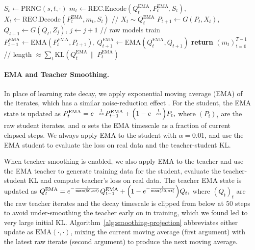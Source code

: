 \documentclass{article}
\theoremstyle{plain}
\theoremstyle{definition}
\theoremstyle{remark}
\begin{document}
\begin{algorithm}[t]
\begin{algorithmic}[1]
    \ENDWHILE
  \ENDIF
  \STATE $S_t \leftarrow \mathrm{PRNG}(s,t,\cdot)$
  \STATE $m_t \leftarrow \mathrm{REC.Encode}(Q^{\text{EMA}}_t, P^{\text{EMA}}_t, S_t)$, \quad $X_t \leftarrow \mathrm{REC.Decode}(P^{\text{EMA}}_t, m_t, S_t)$ \hfill {\color{black!55}// $X_t \sim Q^{\text{EMA}}_t$}
  \STATE $P_{t+1} \leftarrow G(P_t, X_t)$, \quad $Q_{t+1} \leftarrow G(Q_t, Z_j)$, \; $j \leftarrow j+1$ \hfill {\color{black!55}// raw models train}
  \STATE $P^{\text{EMA}}_{t+1} \leftarrow \mathrm{EMA}(P^{\text{EMA}}_t, P_{t+1})$, \quad $Q^{\text{EMA}}_{t+1} \leftarrow \mathrm{EMA}(Q^{\text{EMA}}_t, Q_{t+1})$
\ENDFOR
\STATE \textbf{return} $(m_t)_{t=0}^{T-1}$ \hfill {\color{black!55}//  length $\approx \sum_{t} \mathrm{KL}(Q^{\text{EMA}}_t\,\|\,P^{\text{EMA}}_t)$}
\end{algorithmic}
\end{algorithm}


\paragraph{EMA and Teacher Smoothing.}
In place of learning rate decay, we apply exponential moving average (EMA) of the iterates, which has a similar noise-reduction effect \citep{hagele2024scaling}. For the student, the EMA state is updated as $P^{\text{EMA}}_{t} = e^{-\frac{1}{\alpha t}} P^{\text{EMA}}_{t-1} + \qty(1 - e^{-\frac{1}{\alpha t}}) P_t,$ where $(P_t)_t$ are the raw student iterates, and $\alpha$ sets the EMA timescale as a fraction of current elapsed steps. We always apply EMA to the student with $\alpha=0.01$, and use the EMA student to evaluate the loss on real data and the teacher-student KL.  

When teacher smoothing is enabled, we also apply EMA to the teacher and use the EMA teacher to generate training data for the student, evaluate the teacher-student KL and compute teacher's loss on real data. The teacher EMA state is updated as $Q^{\text{EMA}}_{t} = e^{-\frac{1}{\max(50, \alpha t)}} Q^{\text{EMA}}_{t-1} + \qty(1 - e^{-\frac{1}{\max(50, \alpha t)}}) Q_t,$ where $(Q_t)_t$ are the raw teacher iterates and the decay timescale is clipped from below at $50$ steps to avoid under-smoothing the teacher early on in training, which we found led to very large initial KL. Algorithm~\ref{alg:smoothing-projection} abbreviates either update as $\mathrm{EMA}(\cdot,\cdot)$, mixing the current moving average (first argument) with the latest raw iterate (second argument) to produce the next moving average.
%
\end{document}
